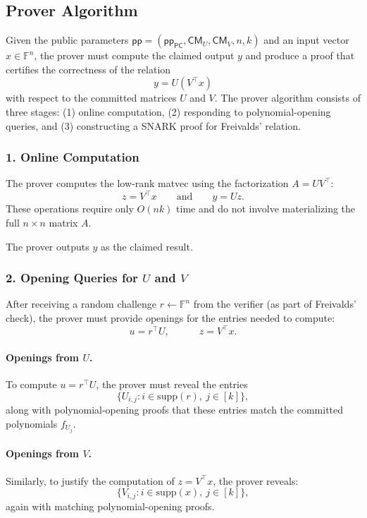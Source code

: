 \documentclass[11pt]{article}
\begin{document}
\subsection{Prover Algorithm}

Given the public parameters 
$\mathsf{pp} = (\mathsf{pp}_{\mathsf{PC}}, \mathsf{CM}_U, \mathsf{CM}_V, n, k)$
and an input vector $x \in \mathbb{F}^n$, the prover must compute the
claimed output $y$ and produce a proof that certifies the correctness of
the relation
\[
  y = U(V^\top x)
\]
with respect to the committed matrices $U$ and $V$.
The prover algorithm consists of three stages:
(1) online computation,  
(2) responding to polynomial-opening queries,  
and (3) constructing a SNARK proof for Freivalds’ relation.

\subsubsection{1. Online Computation}

The prover computes the low-rank matvec using the factorization
$A = U V^\top$:
\[
  z = V^\top x  \qquad\text{and}\qquad  y = U z.
\]
These operations require only $O(nk)$ time and do not involve materializing
the full $n \times n$ matrix $A$.

The prover outputs $y$ as the claimed result.

\subsubsection{2. Opening Queries for $U$ and $V$}

After receiving a random challenge $r \leftarrow \mathbb{F}^n$ from the
verifier (as part of Freivalds' check), the prover must provide openings
for the entries needed to compute:
\[
  u = r^\top U, \qquad\quad z = V^\top x.
\]

\paragraph{Openings from $U$.}
To compute $u = r^\top U$, the prover must reveal the entries
\[
  \{ U_{i,j} : i \in \mathrm{supp}(r),\ j \in [k] \},
\]
along with polynomial-opening proofs that these entries match the 
committed polynomials $f_{U_j}$.

\paragraph{Openings from $V$.}
Similarly, to justify the computation of $z = V^\top x$, the prover
reveals:
\[
  \{ V_{i,j} : i \in \mathrm{supp}(x),\ j \in [k] \},
\]
again with matching polynomial-opening proofs.
\end{document}
